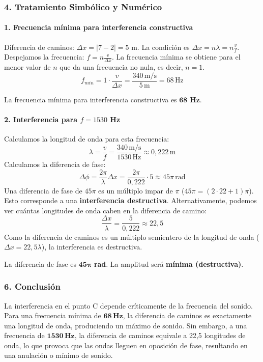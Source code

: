 \subsubsection*{4. Tratamiento Simbólico y Numérico}
\paragraph*{1. Frecuencia mínima para interferencia constructiva}
Diferencia de caminos: $\Delta x = |7 - 2| = 5$ m.
La condición es $\Delta x = n\lambda = n \frac{v}{f}$. Despejamos la frecuencia: $f = n \frac{v}{\Delta x}$.
La frecuencia mínima se obtiene para el menor valor de $n$ que da una frecuencia no nula, es decir, $n=1$.
$$f_{min} = 1 \cdot \frac{v}{\Delta x} = \frac{340 \, \text{m/s}}{5 \, \text{m}} = 68 \, \text{Hz}$$
\begin{cajaresultado}
    La frecuencia mínima para interferencia constructiva es $\boldsymbol{68}$ \textbf{Hz}.
\end{cajaresultado}

\paragraph*{2. Interferencia para $f=1530$ Hz}
Calculamos la longitud de onda para esta frecuencia:
$$\lambda = \frac{v}{f} = \frac{340 \, \text{m/s}}{1530 \, \text{Hz}} \approx 0,222 \, \text{m}$$
Calculamos la diferencia de fase:
$$\Delta\phi = \frac{2\pi}{\lambda}\Delta x = \frac{2\pi}{0,222} \cdot 5 \approx 45\pi \, \text{rad}$$
Una diferencia de fase de $45\pi$ es un múltiplo impar de $\pi$ ($45\pi = (2 \cdot 22 + 1)\pi$). Esto corresponde a una \textbf{interferencia destructiva}.
Alternativamente, podemos ver cuántas longitudes de onda caben en la diferencia de camino:
$$\frac{\Delta x}{\lambda} = \frac{5}{0,222} \approx 22,5$$
Como la diferencia de caminos es un múltiplo semientero de la longitud de onda ($\Delta x = 22,5 \lambda$), la interferencia es destructiva.
\begin{cajaresultado}
    La diferencia de fase es $\boldsymbol{45\pi}$ \textbf{rad}. La amplitud será \textbf{mínima (destructiva)}.
\end{cajaresultado}

\subsubsection*{6. Conclusión}
\begin{cajaconclusion}
La interferencia en el punto C depende críticamente de la frecuencia del sonido. Para una frecuencia mínima de $\mathbf{68 \, Hz}$, la diferencia de caminos es exactamente una longitud de onda, produciendo un máximo de sonido. Sin embargo, a una frecuencia de $\mathbf{1530 \, Hz}$, la diferencia de caminos equivale a 22,5 longitudes de onda, lo que provoca que las ondas lleguen en oposición de fase, resultando en una anulación o mínimo de sonido.
\end{cajaconclusion}

